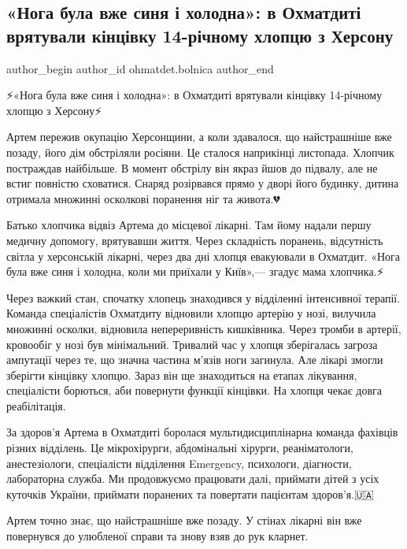  
 
 
 
 

\subsection{«Нога була вже синя і холодна»: в Охматдиті врятували кінцівку 14-річному хлопцю з Херсону}
\label{sec:05_01_2023.fb.ohmatdet.bolnica.1._noga_bula_vzhe_siny}

\ifcmt
 author_begin
   author_id ohmatdet.bolnica
 author_end
\fi

⚡️«Нога була вже синя і холодна»: в Охматдиті врятували кінцівку 14-річному
хлопцю з Херсону⚡️

Артем пережив окупацію Херсонщини, а коли здавалося, що найстрашніше вже
позаду, його дім обстріляли росіяни. Це сталося наприкінці листопада. Хлопчик
постраждав найбільше. В момент обстрілу він якраз йшов до підвалу, але не встиг
повністю сховатися. Снаряд розірвався прямо у дворі його будинку, дитина
отримала множинні осколкові поранення ніг та живота.💔

Батько хлопчика відвіз Артема до місцевої лікарні. Там йому надали першу
медичну допомогу, врятувавши життя. Через складність поранень, відсутність
світла у херсонській лікарні, через два дні хлопця евакуювали в Охматдит. «Нога
була вже синя і холодна, коли ми приїхали у Київ»,— згадує мама хлопчика.⚡️

Через важкий стан, спочатку хлопець знаходився у відділенні інтенсивної
терапії. Команда спеціалістів Охматдиту відновили хлопцю артерію у нозі,
вилучила множинні осколки, відновила непереривність кишківника. Через тромби в
артерії, кровообіг у нозі був мінімальний. Тривалий час у хлопця зберігалась
загроза ампутації через те, що значна частина м'язів ноги загинула. Але лікарі
змогли зберігти кінцівку хлопцю. Зараз він ще знаходиться на етапах лікування,
спеціалісти борються, аби повернути функції кінцівки. На хлопця чекає довга
реабілітація.🙏🏻

За здоров'я Артема в Охматдиті боролася мультидисциплінарна команда фахівців
різних відділень. Це мікрохірурги, абдомінальні хірурги, реаніматологи,
анестезіологи, спеціалісти відділення Emergency, психологи, діагности,
лабораторна служба. Ми продовжуємо працювати далі, приймати дітей з усіх
куточків України, приймати поранених та повертати пацієнтам здоров'я.🇺🇦

Артем точно знає, що найстрашніше вже позаду. У стінах лікарні він вже
повернувся до улюбленої справи та знову взяв до рук кларнет. 💪🏻
